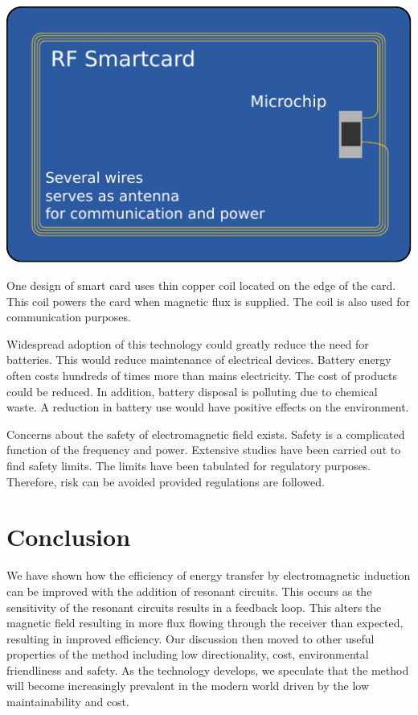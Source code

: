 \documentclass[a4paper,justified,nobib]{tufte-handout}
\begin{document}
\begin{marginfigure}
  \includegraphics[scale=0.57]{images/smartcard.pdf}
  \caption{One design of smart card uses thin copper coil located on the
  edge of the card.
  This coil powers the card when magnetic flux is supplied.
  The coil is also used for communication purposes.\cite{wikiRIC}}
\end{marginfigure}

Widespread adoption of this technology could greatly reduce the need for batteries.
This would reduce maintenance of electrical devices.
Battery energy often costs
hundreds of times more than mains electricity.
The cost of products could be reduced.
In addition, battery disposal is polluting due to chemical waste.
A reduction in battery use would have positive effects on the environment.
\cite{Batteries}

Concerns about the safety of electromagnetic field exists.
Safety is a complicated function of the frequency and power.
Extensive studies have been carried out to find safety limits.
The limits have been tabulated for regulatory purposes.
Therefore, risk can be avoided provided regulations are followed.\cite{IEEE}

\section{Conclusion}

We have shown how the efficiency of energy transfer by electromagnetic
induction can be improved with the addition of resonant circuits.
This occurs as the sensitivity of the resonant circuits results in a feedback
loop.
This alters the magnetic field resulting in more flux flowing through the
receiver than expected, resulting in improved efficiency.
Our discussion then moved to other useful properties of the method including
low directionality, cost, environmental friendliness and safety.
As the technology develops, we speculate that the method will become
increasingly prevalent in the modern world driven by the low maintainability
and cost.




\printbibliography
\end{document}
